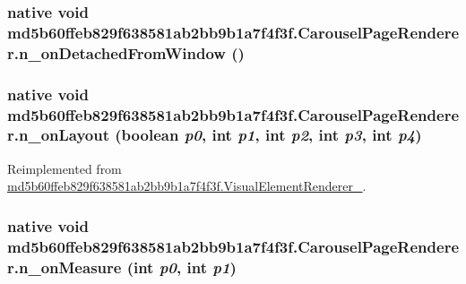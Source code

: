 \hypertarget{classmd5b60ffeb829f638581ab2bb9b1a7f4f3f_1_1_carousel_page_renderer_1afc838401eaec1464487a0b2ef4b20a}{
\subsubsection[{n\_\-onDetachedFromWindow}]{\setlength{\rightskip}{0pt plus 5cm}native void md5b60ffeb829f638581ab2bb9b1a7f4f3f.CarouselPageRenderer.n\_\-onDetachedFromWindow ()}}
\label{classmd5b60ffeb829f638581ab2bb9b1a7f4f3f_1_1_carousel_page_renderer_1afc838401eaec1464487a0b2ef4b20a}


\hypertarget{classmd5b60ffeb829f638581ab2bb9b1a7f4f3f_1_1_carousel_page_renderer_2efb0f1874a6cb3040c950ab5e63022a}{
\subsubsection[{n\_\-onLayout}]{\setlength{\rightskip}{0pt plus 5cm}native void md5b60ffeb829f638581ab2bb9b1a7f4f3f.CarouselPageRenderer.n\_\-onLayout (boolean {\em p0}, \/  int {\em p1}, \/  int {\em p2}, \/  int {\em p3}, \/  int {\em p4})}}
\label{classmd5b60ffeb829f638581ab2bb9b1a7f4f3f_1_1_carousel_page_renderer_2efb0f1874a6cb3040c950ab5e63022a}




Reimplemented from \hyperlink{classmd5b60ffeb829f638581ab2bb9b1a7f4f3f_1_1_visual_element_renderer__1_93658aeaafe1fbcb5301e4b9cbf9f833}{md5b60ffeb829f638581ab2bb9b1a7f4f3f.VisualElementRenderer\_}.\hypertarget{classmd5b60ffeb829f638581ab2bb9b1a7f4f3f_1_1_carousel_page_renderer_8b749d1c9355603a40cba3be0b3b1c0f}{
\subsubsection[{n\_\-onMeasure}]{\setlength{\rightskip}{0pt plus 5cm}native void md5b60ffeb829f638581ab2bb9b1a7f4f3f.CarouselPageRenderer.n\_\-onMeasure (int {\em p0}, \/  int {\em p1})}}
\label{classmd5b60ffeb829f638581ab2bb9b1a7f4f3f_1_1_carousel_page_renderer_8b749d1c9355603a40cba3be0b3b1c0f}



